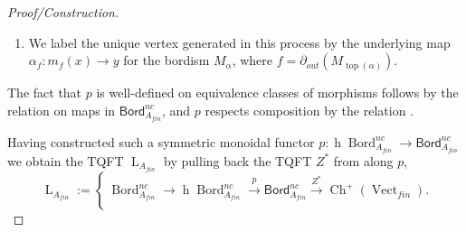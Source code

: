 \documentclass[reqno]{amsart}
\theoremstyle{definition}
\newcommand{\msf}[1]{\mathsf{#1}}
\newcommand{\opn}[1]{\operatorname{#1}}
\newcommand{\dL}{\operatorname{L}}
\DeclareMathOperator{\Bord}{Bord}
\renewcommand{\1}{\mathbf{1}}
\begin{document}
\begin{proof}[Proof/Construction]
\begin{enumerate}
\[{\begin{tikzpicture}[x=0.75pt,y=0.75pt,yscale=-1,xscale=1]
\draw (232.26,40.89) node [anchor=north west][inner sep=0.75pt]   [align=left] {$\displaystyle \Sigma '$};
\draw (494.58,41.79) node [anchor=north west][inner sep=0.75pt]   [align=left] {$\displaystyle \Sigma '$};
\draw (149,113) node [anchor=north west][inner sep=0.75pt]  [rotate=-55.49] [align=left] {$\displaystyle \cdots $};
\draw (394.35,113) node [anchor=north west][inner sep=0.75pt]  [rotate=-55.49] [align=left] {$\displaystyle \cdots $};
\draw (85.66,77.22) node [anchor=north west][inner sep=0.75pt]  [font=\scriptsize] [align=left] {$\displaystyle 1$};
\draw (103.65,91.62) node [anchor=north west][inner sep=0.75pt]  [font=\scriptsize] [align=left] {$\displaystyle 2$};
\draw (141.53,140.19) node [anchor=north west][inner sep=0.75pt]  [font=\scriptsize] [align=left] {$\displaystyle r$};
\draw (384.91,140.19) node [anchor=north west][inner sep=0.75pt]  [font=\scriptsize] [align=left] {$\displaystyle r$};
\draw (332.83,78.12) node [anchor=north west][inner sep=0.75pt]  [font=\scriptsize] [align=left] {$\displaystyle 1$};
\draw (351.77,93.41) node [anchor=north west][inner sep=0.75pt]  [font=\scriptsize] [align=left] {$\displaystyle 2$};
\draw (303.94,105.65) node [anchor=north west][inner sep=0.75pt]   [align=left] {$\displaystyle \mapsto $};
\filldraw (448.66,116.45) circle (1pt);
\end{tikzpicture}}
\]
\item[(c)] We label the unique vertex generated in this process by the underlying map $\alpha_f:m_f(x)\to y$ for the bordism $M_{\alpha}$, where $f=\partial_{out}(M_{\opn{top}(\alpha)})$.
\end{enumerate}
The fact that $p$ is well-defined on equivalence classes of morphisms follows by the relation \cite[Section 5.2, U3]{czenkynegron} on maps in $\msf{Bord}^{nc}_{A_{fin}}$, and $p$ respects composition by the relation \cite[Section 5.2, U1]{czenkynegron}. 
\par

Having constructed such a symmetric monoidal functor $p:\opn{h}\Bord^{nc}_{A_{fin}}\to \msf{Bord}^{nc}_{A_{fin}}$ we obtain the TQFT $\dL_{A_{fin}}$ by pulling back the TQFT $Z^{\ast}$ from \cite[Theorem 9.3]{czenkynegron} along $p$,
\[
\dL_{A_{fin}}:=\left\{\ \Bord^{nc}_{A_{fin}}\to \opn{h}\Bord^{nc}_{A_{fin}}\overset{p}\to \msf{Bord}^{nc}_{A_{fin}}\overset{Z^{\ast}}\to \opn{Ch}^+(\opn{Vect}_{fin}).\right.
\]
\end{proof}
\end{document}
